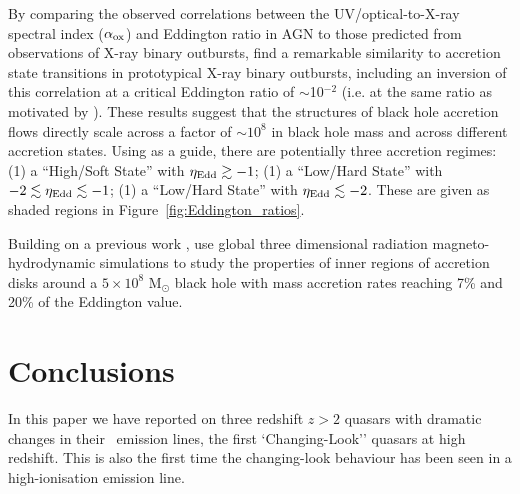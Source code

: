 \documentclass[fleqn,usenatbib]{mnras}
\begin{document}
By comparing the observed correlations between the UV/optical-to-X-ray
spectral index ($\alpha_{\rm ox}$) and Eddington ratio in AGN to those
predicted from observations of X-ray binary outbursts,
\citet{Ruan2019a} find a remarkable similarity to accretion state transitions in prototypical
X-ray binary outbursts, including an inversion of this correlation at
a critical Eddington ratio of $\sim$10$^{-2}$ (i.e. at the same ratio
as motivated by \citet{NodaDone2018}).  These results suggest that the
structures of black hole accretion flows directly scale across a
factor of $\sim10^{8}$ in black hole mass and across different
accretion states. Using \citet{Ruan2019a} as a guide, there are potentially three accretion regimes: 
(1) a ``High/Soft State'' with $\eta_{\rm Edd} \gtrsim -1$; 
(1) a ``Low/Hard State'' with $-2 \lesssim \eta_{\rm Edd} \lesssim  -1$;
(1) a ``Low/Hard State'' with $\eta_{\rm Edd} \lesssim -2$.
These are given as shaded regions in Figure~\ref{fig:Eddington_ratios}.

Building on a previous work \citep[e.g.,][]{JiangYF2014, JiangYF2016, JiangYF2019}, \citet{JiangYF2019arXiv} use global three dimensional radiation magneto-hydrodynamic simulations to study the properties of inner regions of accretion disks around a $5 \times 10^{8}$ M$_{\odot}$ black hole with mass accretion rates reaching 7\% and 20\% of the Eddington value.




\section{Conclusions}
In this paper we have reported on three redshift $z>2$ quasars with
dramatic changes in their \civ\ emission lines, the first
`Changing-Look'' quasars at high redshift.  This is also the first
time the changing-look behaviour has been seen in a high-ionisation
emission line.
\end{document}
